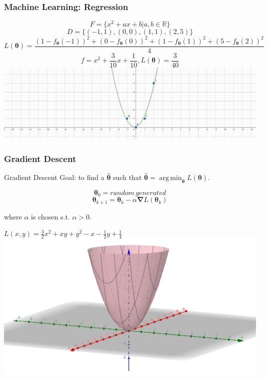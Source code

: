 \documentclass{beamer}
\DeclareMathOperator*{\argmin}{arg\,min}
\begin{document}
\begin{frame}
    \frametitle{Machine Learning: Regression}

    \begin{example}
        \[F = \{x^2 + ax + b \vert a, b \in \mathbb{R}\}\]
        \[D = \{(-1, 1), (0, 0), (1, 1), (2, 5)\}\]
        \[L(\boldsymbol{\theta}) = \frac{(1 - f_{\boldsymbol{\theta}}(-1))^2 + (0 - f_{\boldsymbol{\theta}}(0))^2 + (1 - f_{\boldsymbol{\theta}}(1))^2 + (5 - f_{\boldsymbol{\theta}}(2))^2}{4}\]
        \[f = x^2 + \frac{3}{10}x + \frac{1}{10}, L(\boldsymbol{\theta}) = \frac{3}{40}\]
        \centering
        \includegraphics[height=.3\textheight]{res/function.png}
    \end{example}

\end{frame}

\begin{frame}
    
\frametitle{Gradient Descent}
    
\begin{block}{Gradient Descent}
    Goal: to find a $\hat{\boldsymbol{\theta}}$ such that $\hat{\boldsymbol{\theta}} = \argmin_{\boldsymbol{\theta}} L(\boldsymbol{\theta})$.

    \[\boldsymbol{\theta}_{0} = random\,generated\]
    \[\boldsymbol{\theta}_{k + 1} = \boldsymbol{\theta}_{k} - \alpha\boldsymbol{\nabla} L(\boldsymbol{\theta}_{k})\]

    where $\alpha$ is chosen s.t. $\alpha > 0$.
\end{block}

\begin{example}
    $L(x, y) = \frac{3}{2}x^2 + xy + y^2 - x - \frac{1}{2}y + \frac{1}{4}$
    \centering
    \includegraphics[height=.3\textheight]{res/func3d.png}
\end{example}

\end{frame}
\end{document}
